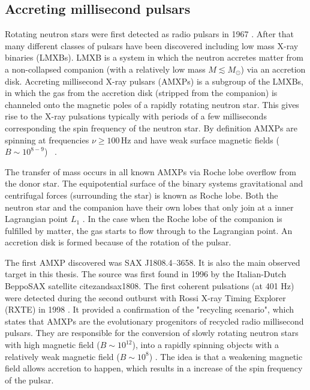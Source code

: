 \documentclass{wihuri}
\begin{document}
\subsection{Accreting millisecond pulsars}




Rotating neutron stars were first detected as radio pulsars in 1967 \cite{gold68}. %
After that many different classes of pulsars have been discovered including low mass X-ray binaries (LMXBs). LMXB is a system in which the neutron accretes matter from a non-collapsed companion (with a relatively low mass $M \lesssim  M_{\odot}$) via an accretion disk. Accreting millisecond X-ray pulsars (AMXPs) is a subgroup of the LMXBs, in which the gas from the accretion disk (stripped from the companion) is channeled onto the magnetic poles of a rapidly rotating neutron star. This gives rise to the X-ray pulsations typically with periods of a few milliseconds corresponding the spin frequency of the neutron star. By definition AMXPs are spinning at frequencies $\nu \ge 100 \, \mathrm{Hz}$ and have weak surface magnetic fields ($B \sim 10^{8-9}$) ~\cite{patruno}. 

The transfer of mass occurs in all known AMXPs via Roche lobe overflow from the donor star. The equipotential surface of the binary systems gravitational and centrifugal forces (surrounding the star) is known as Roche lobe. Both the neutron star and the companion have their own lobes that  only join at a inner Lagrangian point $L_{1}$ \cite{frank85}. %
In the case when the Roche lobe of the companion is fulfilled by matter, the gas starts to flow through to the Lagrangian point. An accretion disk is formed because of the rotation of the pulsar.
 

The first AMXP discovered was SAX J1808.4–3658. It is also the main observed target in this thesis. The source was first found in 1996 by the Italian-Dutch BeppoSAX satellite cite{zandsax1808}. %
The first coherent pulsations (at 401 Hz) were detected during the second outburst with Rossi X-ray Timing Explorer (RXTE) in 1998 \cite{wijnandssax1808}. %
It provided a confirmation of the "recycling scenario", which states that AMXPs are the evolutionary progenitors of recycled radio millisecond pulsars. They are responsible for the conversion of slowly rotating neutron stars with high magnetic field ($B \sim 10^{12}$), into a rapidly spinning objects with a relatively weak magnetic field ($B \sim 10^{8}$) \cite{patruno}. The idea is that a weakening magnetic field allows accretion to happen, which results in a increase of the spin frequency of the pulsar.
\end{document}
